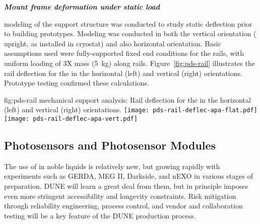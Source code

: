 
\textit{\bf {} Mount frame deformation under static  load}


 modeling of the  support structure was conducted to study static deflection 
prior to building prototypes.  Modeling was conducted in both the vertical
 orientation ( upright, as installed in cryostat) and also horizontal orientation.  
Basic assumptions used were fully-supported fixed end conditions for the rails, 
with uniform loading of 3X  mass (\SI{5}{kg}) along rails.  
Figure~\ref{fig:pds-rail} illustrates the rail deflection for the  in the horizontal (left) and vertical (right) orientations.
Prototype testing confirmed these calculations.

\begin{dunefigure}{fig:pds-rail}
{ mechanical support analysis: Rail deflection for the  in the horizontal (left) and vertical (right) orientations.}
	\texttt{[image: pds-rail-deflec-apa-flat.pdf]} 
	\texttt{[image: pds-rail-deflec-apa-vert.pdf]}\\
\end{dunefigure}


\subsection{Photosensors and Photosensor Modules}
\label{sec:fdsp-pd-assy-psm}

The use of  in noble liquids is relatively new, but growing rapidly with experiments such as GERDA, MEG II, Darkside, and nEXO in various stages of preparation.
DUNE will learn a great deal %
from them, but in principle imposes even more stringent accessibility and longevity constraints. Risk mitigation through reliability engineering, process control, and vendor and collaboration testing will be a key feature of the DUNE  production process.


